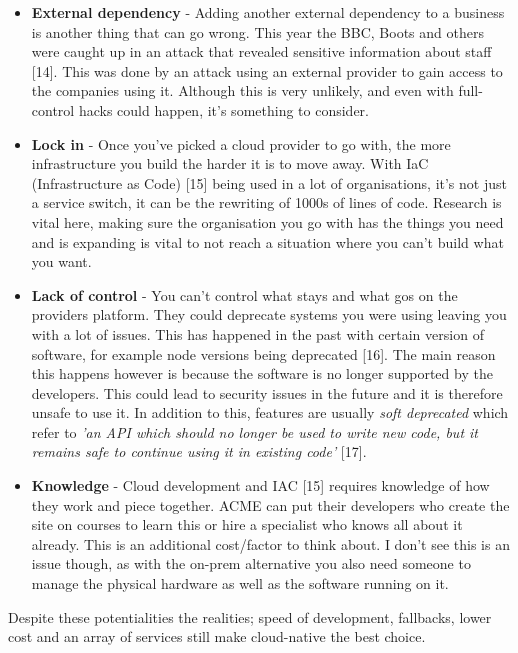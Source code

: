   \begin{itemize}
    \item \textbf{External dependency} - Adding another external dependency to a business is another thing that can go wrong. This year the BBC, Boots and
    others were caught up in an attack that revealed sensitive information about staff [14]. This was done by an attack using an external provider to gain 
    access to the companies using it. Although this is very unlikely, and even with full-control hacks could happen, it's something to consider.
    \item \textbf{Lock in} - Once you've picked a cloud provider to go with, the more infrastructure you build the harder it is to move away. With 
    IaC (Infrastructure as Code) [15] being used in a lot of organisations, it's not just a service switch, it can be the rewriting of 1000s of lines
    of code. Research is vital here, making sure the organisation you go with has the things you need and is expanding is vital to not reach a situation where
    you can't build what you want. 
    \item \textbf{Lack of control} - You can't control what stays and what gos on the providers platform. They could deprecate systems you were using leaving 
    you with a lot of issues. This has happened in the past with certain version of software, for example node versions being deprecated [16]. The main
    reason this happens however is because the software is no longer supported by the developers. This could lead to security issues in the future and it is 
    therefore unsafe to use it. In addition to this, features are usually \textit{soft deprecated} which refer to \textit{'an API which should no longer be 
    used to write new code, but it remains safe to continue using it in existing code'} [17].
    \item \textbf{Knowledge} - Cloud development and IAC [15] requires knowledge of how they work and piece together. ACME can put their developers who create
    the site on courses to learn this or hire a specialist who knows all about it already. This is an additional cost/factor to think about. I 
    don't see this is an issue though, as with the on-prem alternative you also need someone to manage the physical hardware as well as the software 
    running on it.
  \end{itemize}

  Despite these potentialities the realities; speed of development, fallbacks, lower cost and an array of services still make cloud-native the best choice.

